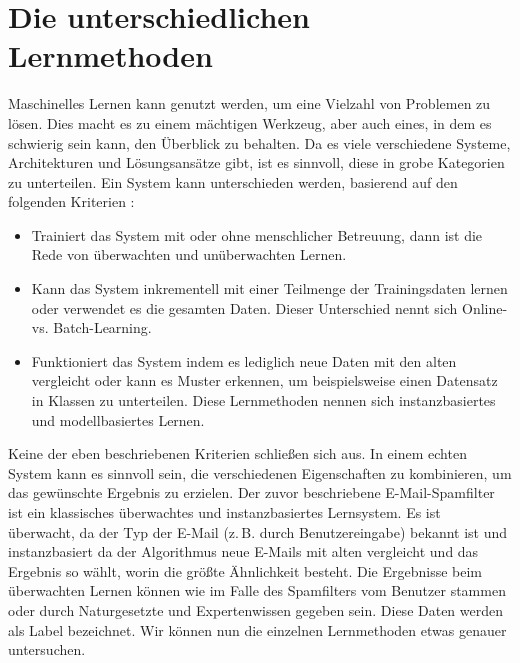 \section{Die unterschiedlichen Lernmethoden}
\label{sec:lernmethoden}
Maschinelles Lernen kann genutzt werden, um eine Vielzahl von Problemen zu lösen.
Dies macht es zu einem mächtigen Werkzeug, aber auch eines, in dem es schwierig sein
kann, den Überblick zu behalten.
Da es viele verschiedene Systeme, Architekturen und Lösungsansätze gibt, ist es sinnvoll,
diese in grobe Kategorien zu unterteilen.
Ein System kann unterschieden werden, basierend auf den folgenden
Kriterien \parencite[7]{book:hands-on-ml}:
\begin{itemize}
  \item Trainiert das System mit oder ohne menschlicher Betreuung, dann ist
        die Rede von überwachten und unüberwachten Lernen.
  \item Kann das System inkrementell mit einer Teilmenge der Trainingsdaten
        lernen oder verwendet es die gesamten Daten. Dieser Unterschied
        nennt sich Online- vs. Batch-Learning.
  \item Funktioniert das System indem es lediglich neue Daten mit
        den alten vergleicht oder kann es Muster erkennen, um beispielsweise
        einen Datensatz in Klassen zu unterteilen.
        Diese Lernmethoden nennen sich instanzbasiertes und modellbasiertes Lernen.
\end{itemize}
Keine der eben beschriebenen Kriterien schließen sich aus.
In einem echten System kann es sinnvoll sein, die verschiedenen
Eigenschaften zu kombinieren, um das gewünschte Ergebnis
zu erzielen. Der zuvor beschriebene E-Mail-Spamfilter
ist ein klassisches überwachtes und instanzbasiertes Lernsystem.
Es ist überwacht, da der Typ der E-Mail (z.\,B. durch Benutzereingabe)
bekannt ist und instanzbasiert da
der Algorithmus neue E-Mails mit alten vergleicht und das
Ergebnis so wählt, worin die größte Ähnlichkeit besteht.
Die Ergebnisse beim überwachten Lernen können wie im Falle des
Spamfilters vom Benutzer stammen oder durch Naturgesetzte und Expertenwissen
gegeben sein. Diese Daten werden als Label bezeichnet.
Wir können nun die einzelnen Lernmethoden etwas genauer untersuchen.

